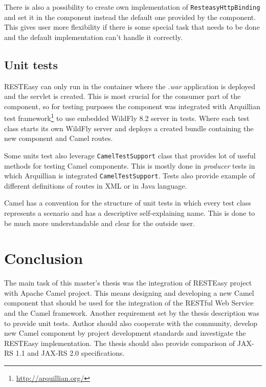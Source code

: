 \documentclass[12pt,final,oneside]{fithesis2}
\begin{document}
There is also a possibility to create own implementation of \texttt{Resteasy\-HttpBinding} and set it in the component instead the default one provided by the component. This gives user more flexibility if there is some special task that needs to be done and the default implementation can't handle it correctly.  


\section{Unit tests}
RESTEasy can only run in the container where the \textit{.war} application is deployed and the servlet is created. This is most crucial for the consumer part of the component, so for testing purposes the component was integrated with Arquillian test framework\footnote{\url{http://arquillian.org/}} to use embedded WildFly 8.2 server in tests. Where each test class starts its own WildFly server and deploys a created bundle containing the new component and Camel routes.  

Some units test also leverage \texttt{CamelTestSupport} class that provides lot of useful methods for testing Camel components. This is mostly done in \textit{producer} tests in which Arquillian is integrated \texttt{CamelTestSupport}. Tests also provide example of different definitions of routes in XML or in Java language.

Camel has a convention for the structure of unit tests in which every test class represents a scenario and has a descriptive self-explaining name. This is done to be much more understandable and clear for the outside user. 


\chapter{Conclusion}
The main task of this master's thesis was the integration of RESTEasy project with Apache Camel project. This means designing and developing a new Camel component that should be used for the integration of the RESTful Web Service and the Camel framework. Another requirement set by the thesis description was to provide unit tests. Author should also cooperate with the community, develop new Camel component by project development standards and investigate the RESTEasy implementation. The thesis should also provide comparison of JAX-RS 1.1 and JAX-RS 2.0 specifications.
\end{document}
